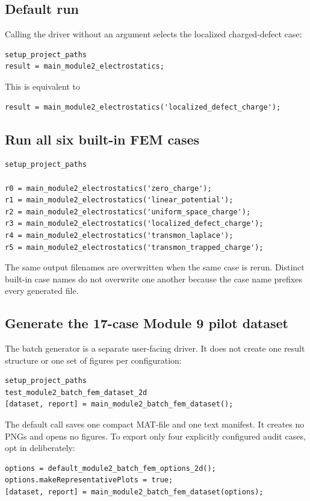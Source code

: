 \documentclass[11pt]{article}
\begin{document}
\subsection{Default run}

Calling the driver without an argument selects the localized charged-defect case:
\begin{lstlisting}[style=projectmatlab]
setup_project_paths
result = main_module2_electrostatics;
\end{lstlisting}
This is equivalent to
\begin{lstlisting}[style=projectmatlab]
result = main_module2_electrostatics('localized_defect_charge');
\end{lstlisting}

\subsection{Run all six built-in FEM cases}

\begin{lstlisting}[style=projectmatlab]
setup_project_paths

r0 = main_module2_electrostatics('zero_charge');
r1 = main_module2_electrostatics('linear_potential');
r2 = main_module2_electrostatics('uniform_space_charge');
r3 = main_module2_electrostatics('localized_defect_charge');
r4 = main_module2_electrostatics('transmon_laplace');
r5 = main_module2_electrostatics('transmon_trapped_charge');
\end{lstlisting}
The same output filenames are overwritten when the same case is rerun. Distinct built-in case names do not overwrite one another because the case name prefixes every generated file.

\subsection{Generate the 17-case Module 9 pilot dataset}

The batch generator is a separate user-facing driver. It does not create one result structure or one set of figures per configuration:
\begin{lstlisting}[style=projectmatlab]
setup_project_paths
test_module2_batch_fem_dataset_2d
[dataset, report] = main_module2_batch_fem_dataset();
\end{lstlisting}
The default call saves one compact MAT-file and one text manifest. It creates no PNGs and opens no figures. To export only four explicitly configured audit cases, opt in deliberately:
\begin{lstlisting}[style=projectmatlab]
options = default_module2_batch_fem_options_2d();
options.makeRepresentativePlots = true;
[dataset, report] = main_module2_batch_fem_dataset(options);
\end{lstlisting}
\end{document}

